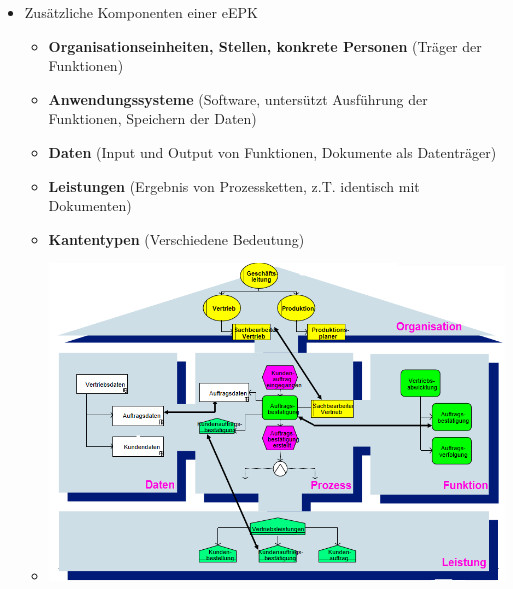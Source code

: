\documentclass[11pt,a4paper]{article}
\begin{document}
\begin{itemize}
	\item Zusätzliche Komponenten einer eEPK
		\begin{itemize}
		\item \textbf{Organisationseinheiten, Stellen, konkrete Personen} (Träger der Funktionen)
		\item \textbf{Anwendungssysteme} (Software, untersützt Ausführung der Funktionen, Speichern der Daten)
		\item \textbf{Daten} (Input und Output von Funktionen, Dokumente als Datenträger)
		\item \textbf{Leistungen} (Ergebnis von Prozessketten, z.T. identisch mit Dokumenten)
		\item \textbf{Kantentypen} (Verschiedene Bedeutung)
		\item[] \includegraphics[width=15cm]{ariseepk}
		\end{itemize}


\end{itemize}
\end{document}
